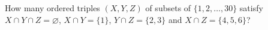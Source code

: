How many ordered triples $(X,Y,Z)$ of subsets of $\{1,2,\dots,30\}$ satisfy $X\cap Y\cap Z=\varnothing$, $X\cap Y=\{1\}$, $Y\cap Z=\{2,3\}$ and $X\cap Z=\{4,5,6\}$?
